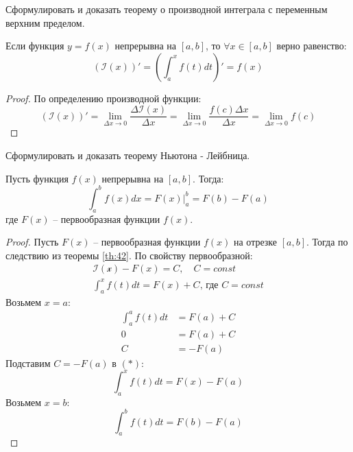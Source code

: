 \begin{question}
	Сформулировать и доказать теорему о производной интеграла с переменным верхним пределом.
\end{question}
\begin{theorem}[О производной]
  \label{th:42}
  Если функция $y = f(x)$ непрерывна на $[a, b]$, то  $\forall x \in [a, b]$ верно равенство: \[
    \left( \mathcal{I}(x) \right)' = \left( \int_a^x f(t) dt \right)' = f(x)
  \] 
\end{theorem}
\begin{proof}
  По определению производной функции: \[
    \left( \mathcal{I}(x) \right)' = \lim_{\Delta x \to 0} \frac{\Delta \mathcal{I}(x)}{\Delta x} = \lim_{\Delta x \to 0} \frac{f(c) \Delta x}{\Delta x} = \lim_{\Delta x \to 0} f(c)
  \] 
\end{proof}


\begin{question}
	Сформулировать и доказать теорему Ньютона - Лейбница.
\end{question}
\begin{theorem}
  Пусть функция $f(x)$ непрерывна на $[a, b]$. Тогда:  \[
    \int_a^b f(x) dx = F(x) \bigg|_a^b = F(b) - F(a)
  \] 
  где $F(x)$ -- первообразная функции $f(x)$.
\end{theorem}
\begin{proof}
  Пусть $F(x)$ -- первообразная функции $f(x)$ на отрезке $[a, b]$. Тогда по следствию из теоремы \ref{th:42}.
  По свойству первообразной:
  \begin{gather*}
    \mathcal{I(x)} - F(x) = C, \quad C = const \\
    \int_a^x f(t) dt = F(x) + C \text{, где } C = const \tag{*} 
  \end{gather*}
  Возьмем $x = a$:
  \begin{align*}
    \int_a^a f(t)dt &= F(a) + C \\
    0 &= F(a) + C \\
    C &= -F(a)
  \end{align*}
  Подставим $C = -F(a)$ в  $(*)$:  \[
    \int_a^x f(t) dt = F(x) - F(a)
  \] 
  Возьмем $x = b$: \[
    \boxed{\int_a^b f(t) dt = F(b) - F(a)}
  \] 
\end{proof}


